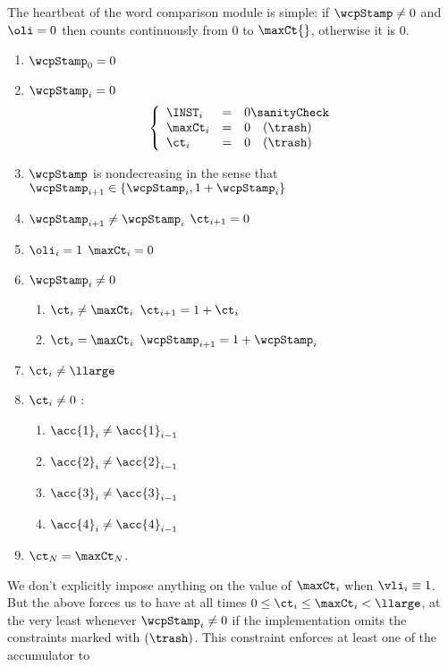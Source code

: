 The heartbeat of the word comparison module is simple: if $\wcpStamp \neq 0$ and $\oli = 0$ then \ct{} counts continuously from $0$ to $\maxCt{}$, otherwise it is $0$.
\begin{enumerate}
	\item $\wcpStamp_{0} = 0$
	\item \If $\wcpStamp_{i} = 0$ \Then
		\[
			\left\{ \begin{array}{lcl}
			    \INST_{i}  & = & 0 \sanityCheck   \\
				\maxCt_{i} & = & 0 \quad (\trash) \\
				\ct_{i}    & = & 0 \quad (\trash) \\
			\end{array} \right.
		\]
	\item $\wcpStamp$ is nondecreasing in the sense that $\wcpStamp_{i + 1} \in \{ \wcpStamp_{i}, 1 + \wcpStamp_{i} \}$
	\item \If $\wcpStamp_{i + 1} \neq \wcpStamp_{i}$ \Then $\ct_{i + 1} = 0$
	\item \If $\oli_{i} = 1$ \Then $\maxCt_{i}=0$
	\item \If $\wcpStamp_{i} \neq 0$ \Then
		\begin{enumerate}
			\item \If $\ct_{i} \neq \maxCt_{i}$ \Then $\ct_{i + 1} = 1 + \ct_{i}$
			\item \If $\ct_{i} =    \maxCt_{i}$ \Then $\wcpStamp_{i + 1} = 1 + \wcpStamp_{i}$
		\end{enumerate}
	\item $\ct_{i} \neq \llarge$
	\item \If $\ct_{i} \neq 0$ \Then: 
	\begin{enumerate}
			\item \Or $\acc{1}_{i} \neq \acc{1}_{i-1}$
			\item \Or $\acc{2}_{i} \neq \acc{2}_{i-1}$
			\item \Or $\acc{3}_{i} \neq \acc{3}_{i-1}$
			\item \Or $\acc{4}_{i} \neq \acc{4}_{i-1}$
	\end{enumerate}	
	\item $\ct_{N} = \maxCt_{N}$.
\end{enumerate}
\saNote{} We don't explicitly impose anything on the value of $\maxCt_i$ when $\vli_i \equiv 1$.
But the above forces us to have at all times $0 \leq \ct_{i} \leq \maxCt_{i} < \llarge$, at the very least whenever $\wcpStamp_{i} \neq 0$ if the implementation omits the constraints marked with $(\trash)$.
\saNote{} This constraint enforces at least one of the accumulator to
